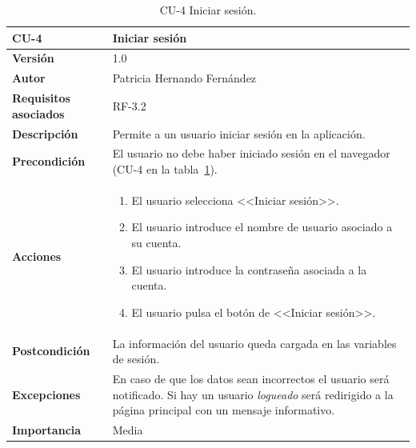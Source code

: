 \begin{table}[p]
	\centering
	\begin{tabularx}{\linewidth}{ p{} p{} }
		\toprule
		\textbf{CU-4}    & \textbf{Iniciar sesión}\\
		\toprule
		\textbf{Versión}              & 1.0    \\
		\textbf{Autor}                & Patricia Hernando Fernández \\
		\textbf{Requisitos asociados} & RF-3.2 \\
		\textbf{Descripción}          & Permite a un usuario iniciar sesión en la aplicación.\\
		\textbf{Precondición}         & El usuario no debe haber iniciado sesión en el navegador (CU-4 en la tabla~\ref{cu:iniciar-sesion}). \\
		\textbf{Acciones}             &
		\begin{enumerate}
			\def\labelenumi{\arabic{enumi}.}
			\tightlist
			\item El usuario selecciona <<Iniciar sesión>>.
			\item El usuario introduce el nombre de usuario asociado a su cuenta.
			\item El usuario introduce la contraseña asociada a la cuenta.
			\item El usuario pulsa el botón de <<Iniciar sesión>>.
		\end{enumerate}\\
		\textbf{Postcondición}        & La información del usuario queda cargada en las variables de sesión. \\
		\textbf{Excepciones}          & En caso de que los datos sean incorrectos el usuario será notificado. Si hay un usuario \textit{logueado} será redirigido a la página principal con un mensaje informativo.\\
		\textbf{Importancia}          & Media \\
		\bottomrule
	\end{tabularx}
	\caption{CU-4 Iniciar sesión.}
	\label{cu:iniciar-sesion}
\end{table}


